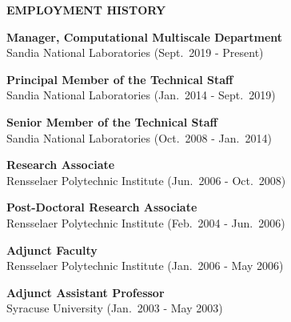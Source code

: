 
\vspace{\sectionskip}
\noindent
{\large \textbf{EMPLOYMENT HISTORY}}
\vspace{\sectionskip}

\begin{minipage}{\minipagewidth}
\textbf{Manager, Computational Multiscale Department}\\Sandia National Laboratories (Sept.~2019 - Present)
\end{minipage}\vspace{\parskip}

\begin{minipage}{\minipagewidth}
\textbf{Principal Member of the Technical Staff}\\Sandia National Laboratories (Jan.~2014 - Sept.~2019)
\end{minipage}\vspace{\parskip}

\begin{minipage}{\minipagewidth}
\textbf{Senior Member of the Technical Staff}\\Sandia National Laboratories (Oct.~2008 - Jan.~2014)
\end{minipage}\vspace{\parskip}

\begin{minipage}{\minipagewidth}
\textbf{Research Associate}\\Rensselaer Polytechnic Institute (Jun.~2006 - Oct.~2008)
\end{minipage}\vspace{\parskip}

\begin{minipage}{\minipagewidth}
\textbf{Post-Doctoral Research Associate}\\Rensselaer Polytechnic Institute (Feb.~2004 - Jun.~2006)
\end{minipage}\vspace{\parskip}

\begin{minipage}{\minipagewidth}
\textbf{Adjunct Faculty}\\Rensselaer Polytechnic Institute (Jan.~2006 - May 2006)
\end{minipage}\vspace{\parskip}

\begin{minipage}{\minipagewidth}
\textbf{Adjunct Assistant Professor}\\Syracuse University (Jan.~2003 - May 2003)
\end{minipage}\vspace{\parskip}


